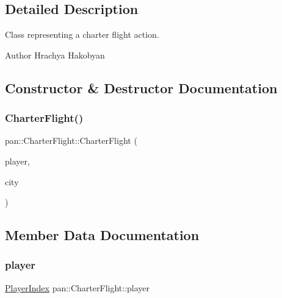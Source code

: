 \subsection{Detailed Description}
Class representing a charter flight action. 

\begin{DoxyAuthor}{Author}
Hrachya Hakobyan 
\end{DoxyAuthor}


\subsection{Constructor \& Destructor Documentation}
\mbox{\label{classpan_1_1_charter_flight_a7e1ae3b2d535c17702106f6bb18d19bc}} 
\subsubsection{\texorpdfstring{Charter\+Flight()}{CharterFlight()}}
{\footnotesize\ttfamily pan\+::\+Charter\+Flight\+::\+Charter\+Flight (\begin{DoxyParamCaption}\item[{\hyperlink{namespacepan_a0cdabf874fbf1bb3a1f0152d108c2909}{Player\+Index}}]{player,  }\item[{\hyperlink{namespacepan_afaed28aa6603153dcc062a028602d697}{City\+Index}}]{city }\end{DoxyParamCaption})}



\subsection{Member Data Documentation}
\mbox{\label{classpan_1_1_charter_flight_a36cd9c4ffde7f07b1d187fddc00638d5}} 
\subsubsection{\texorpdfstring{player}{player}}
{\footnotesize\ttfamily \hyperlink{namespacepan_a0cdabf874fbf1bb3a1f0152d108c2909}{Player\+Index} pan\+::\+Charter\+Flight\+::player}

